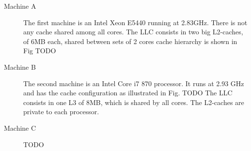 \begin{figure}[htbp]
 \centering%
  \qquad\qquad
 \caption{}
\end{figure}

\begin{description}
\item[Machine A] The first machine is an Intel Xeon E5440 running at 2.83GHz. There is not any cache shared among all cores. The LLC consists in two 
big L2-caches, of 6MB each, shared between sets of 2 cores cache hierarchy is shown in Fig TODO

\item[Machine B] The second machine is an Intel Core i7 870 processor. It runs at 2.93 GHz and has the cache configuration as illustrated in Fig. TODO
The LLC consists in one L3 of 8MB, which is shared by all cores. The L2-caches are private to each processor. 

\item[Machine C] TODO

\end{description}

